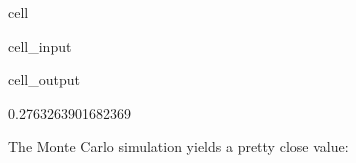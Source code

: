 \documentclass[letterpaper,10pt,english]{jupyterBook}
\begin{document}
\begin{sphinxuseclass}{cell}\begin{sphinxVerbatimInput}

\begin{sphinxuseclass}{cell_input}
\begin{sphinxVerbatim}[commandchars=\\\{\}]
\end{sphinxVerbatim}

\end{sphinxuseclass}\end{sphinxVerbatimInput}
\begin{sphinxVerbatimOutput}

\begin{sphinxuseclass}{cell_output}
\begin{sphinxVerbatim}[commandchars=\\\{\}]
0.2763263901682369
\end{sphinxVerbatim}

\end{sphinxuseclass}\end{sphinxVerbatimOutput}

\end{sphinxuseclass}
\sphinxAtStartPar
The Monte Carlo simulation yields a pretty close value:
\end{document}
